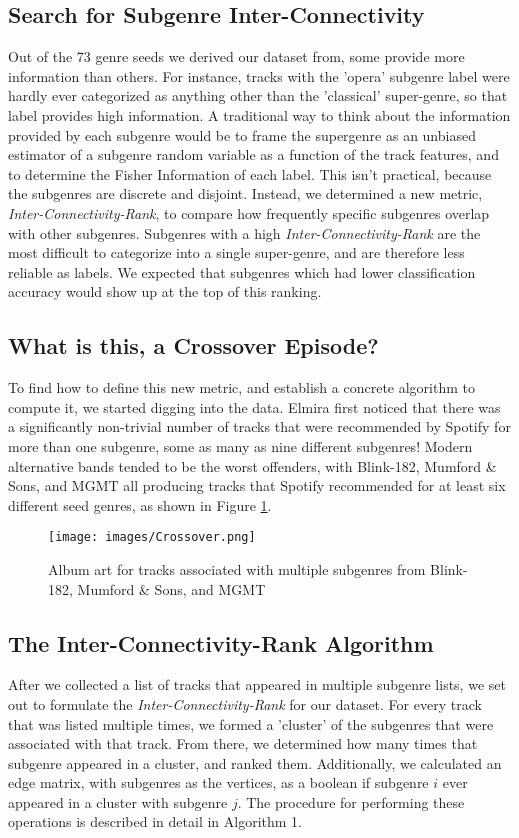 \documentclass[conference]{IEEEtran}
\begin{document}
\subsection{Search for Subgenre Inter-Connectivity}
Out of the 73 genre seeds we derived our dataset from, some provide more information than others. For instance, tracks with the 'opera' subgenre label were hardly ever categorized as anything other than the 'classical' super-genre, so that label provides high information. A traditional way to think about the information provided by each subgenre would be to frame the supergenre as an unbiased estimator of a subgenre random variable as a function of the track features, and to determine the Fisher Information of each label. This isn't practical, because the subgenres are discrete and disjoint. Instead, we determined a new metric, \emph{Inter-Connectivity-Rank}, to compare how frequently specific subgenres overlap with other subgenres. Subgenres with a high \emph{Inter-Connectivity-Rank} are the most difficult to categorize into a single super-genre, and are therefore less reliable as labels. We expected that subgenres which had lower classification accuracy would show up at the top of this ranking.

\subsection{What is this, a Crossover Episode?}
To find how to define this new metric, and establish a concrete algorithm to compute it, we started digging into the data. Elmira first noticed that there was a significantly non-trivial number of tracks that were recommended by Spotify for more than one subgenre, some as many as nine different subgenres! Modern alternative bands tended to be the worst offenders, with Blink-182, Mumford \& Sons, and MGMT all producing tracks that Spotify recommended for at least six different seed genres, as shown in Figure \ref{fig:Crossover}.

\begin{figure}[htbp]
\centerline{\texttt{[image: images/Crossover.png]}}
\caption{Album art for tracks associated with multiple subgenres from Blink-182, Mumford \& Sons, and MGMT}
\label{fig:Crossover}
\end{figure}

\subsection{The Inter-Connectivity-Rank Algorithm}
After we collected a list of tracks that appeared in multiple subgenre lists, we set out to formulate the 
\emph{Inter-Connectivity-Rank} for our dataset. For every track that was listed multiple times, we formed
a 'cluster' of the subgenres that were associated with that track. From there, we determined how many 
times that subgenre appeared in a cluster, and ranked them. Additionally, we calculated an edge matrix,
with subgenres as the vertices, as a boolean if subgenre $i$ ever appeared in a cluster with subgenre $j$.
The procedure for performing these operations is described in detail in Algorithm 1.
\end{document}
